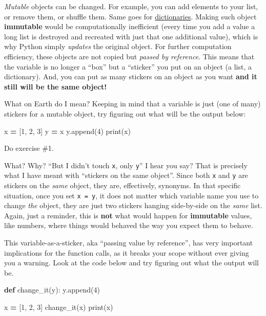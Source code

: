 \documentclass[
]{book}
\newenvironment{Shaded}{\begin{snugshade}}{\end{snugshade}}
\newcommand{\BuiltInTok}[1]{#1}
\newcommand{\DecValTok}[1]{\textcolor[rgb]{0.00,0.00,0.81}{#1}}
\newcommand{\KeywordTok}[1]{\textcolor[rgb]{0.13,0.29,0.53}{\textbf{#1}}}
\newcommand{\NormalTok}[1]{#1}
\newcommand{\OperatorTok}[1]{\textcolor[rgb]{0.81,0.36,0.00}{\textbf{#1}}}
\begin{document}
\emph{Mutable} objects can be changed. For example, you can add elements to your list, or remove them, or shuffle them. Same goes for \href{https://docs.python.org/3/tutorial/datastructures.html?highlight=dictionary\#dictionaries}{dictionaries}. Making such object \textbf{immutable} would be computationally inefficient (every time you add a value a long list is destroyed and recreated with just that one additional value), which is why Python simply \emph{updates} the original object. For further computation efficiency, these objects are not copied but \emph{passed by reference}. This means that the variable is no longer a ``box'' but a ``sticker'' you put on an object (a list, a dictionary). And, you can put as many stickers on an object as you want \textbf{and it still will be the same object!}

What on Earth do I mean? Keeping in mind that a variable is just (one of many) stickers for a mutable object, try figuring out what will be the output below:

\begin{Shaded}
\begin{Highlighting}[]
\NormalTok{x }\OperatorTok{=}\NormalTok{ [}\DecValTok{1}\NormalTok{, }\DecValTok{2}\NormalTok{, }\DecValTok{3}\NormalTok{]}
\NormalTok{y }\OperatorTok{=}\NormalTok{ x}
\NormalTok{y.append(}\DecValTok{4}\NormalTok{)}
\BuiltInTok{print}\NormalTok{(x)}
\end{Highlighting}
\end{Shaded}

Do exercise \#1.

What? Why? ``But I didn't touch \texttt{x}, only \texttt{y}'' I hear you say? That is precisely what I have meant with ``stickers on the same object''. Since both \texttt{x} and \texttt{y} are stickers on the \emph{same} object, they are, effectively, synonyms. In that specific situation, once you set \texttt{x\ =\ y}, it does not matter which variable name you use to change \emph{the} object, they are just two stickers hanging side-by-side on the \emph{same} list. Again, just a reminder, this is \textbf{not} what would happen for \textbf{immutable} values, like numbers, where things would behaved the way you expect them to behave.

This variable-as-a-sticker, aka ``passing value by reference'', has very important implications for the function calls, as it breaks your scope without ever giving you a warning. Look at the code below and try figuring out what the output will be.

\begin{Shaded}
\begin{Highlighting}[]
\KeywordTok{def}\NormalTok{ change\_it(y):}
\NormalTok{    y.append(}\DecValTok{4}\NormalTok{)}

\NormalTok{x }\OperatorTok{=}\NormalTok{ [}\DecValTok{1}\NormalTok{, }\DecValTok{2}\NormalTok{, }\DecValTok{3}\NormalTok{]}
\NormalTok{change\_it(x)}
\BuiltInTok{print}\NormalTok{(x)}
\end{Highlighting}
\end{Shaded}
\end{document}
